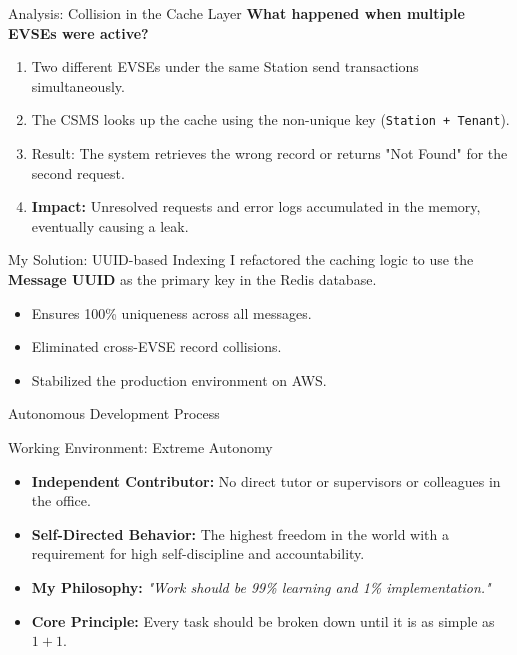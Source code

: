\documentclass[11pt]{beamer}
\begin{document}
\begin{frame}{Analysis: Collision in the Cache Layer}
    \textbf{What happened when multiple EVSEs were active?}
    \begin{enumerate}
        \item Two different EVSEs under the same Station send transactions simultaneously.
        \item The CSMS looks up the cache using the non-unique key (\texttt{Station + Tenant}).
        \item Result: The system retrieves the wrong record or returns "Not Found" for the second request.
        \item \textbf{Impact:} Unresolved requests and error logs accumulated in the memory, eventually causing a leak.
    \end{enumerate}

    \begin{exampleblock}{My Solution: UUID-based Indexing}
        I refactored the caching logic to use the \textbf{Message UUID} as the primary key in the Redis database.
        \begin{itemize}
            \item[\ding{51}] Ensures 100\% uniqueness across all messages.
            \item[\ding{51}] Eliminated cross-EVSE record collisions.
            \item[\ding{51}] Stabilized the production environment on AWS.
        \end{itemize}
    \end{exampleblock}
\end{frame}




\begin{frame}{Autonomous Development Process}
    \begin{block}{Working Environment: Extreme Autonomy}
        \begin{itemize}
            \item \textbf{Independent Contributor:} No direct tutor or supervisors or colleagues in the office.
            \item \textbf{Self-Directed Behavior:} The highest freedom in the world with a requirement for high self-discipline and accountability.
        \end{itemize}
    \end{block}

    \begin{itemize}
        \item \textbf{My Philosophy:} 
            \textit{"Work should be 99\% learning and 1\% implementation."}
        \item \textbf{Core Principle:} Every task should be broken down until it is as simple as $1 + 1$.
    \end{itemize}
\end{frame}
\end{document}
